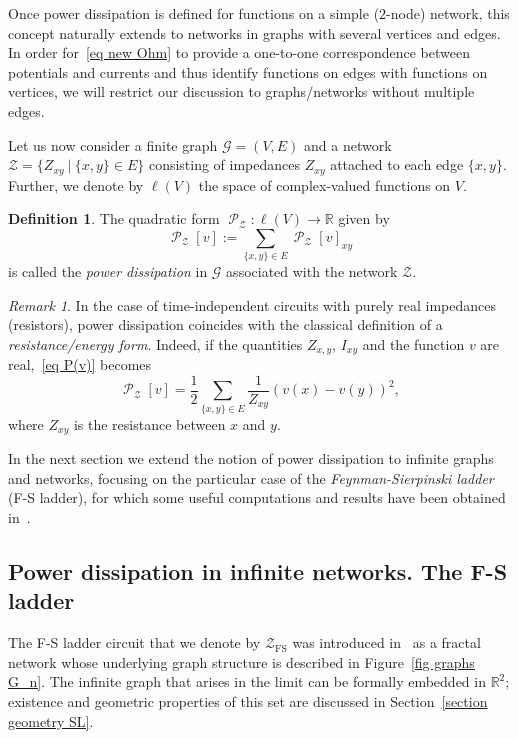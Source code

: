 \documentclass[11pt]{amsart}
\theoremstyle{definition}
\newtheorem{definition}{Definition}[section]
\theoremstyle{remark}
\newtheorem{remark}{Remark}[section]
\theoremstyle{example}
\numberwithin{equation}{section}
\providecommand{\pd}[1]{\operatorname{\mathcal {P}}_{#1}}
\begin{document}
Once power dissipation is defined for functions on a simple ($2$-node) network, this concept naturally extends to networks in graphs with several vertices and edges. In order for~\eqref{eq new Ohm} to provide a one-to-one correspondence between potentials and currents and thus identify functions on edges with functions on vertices, we will restrict our discussion to graphs/networks without multiple edges.
\medskip

Let us now consider a finite graph ${\mathcal{G}}=(V,E)$ and a network ${\mathcal{Z}}=\{Z_{xy}~|~\{x,y\}\in E\}$ consisting of impedances $Z_{xy}$ attached to each edge $\{x,y\}$. Further, we denote by $\ell(V)$ the space of complex-valued functions on $V$. 
\begin{definition}
The quadratic form $\pd{\mathcal{Z}}\colon\ell(V)\to{{\mathbb R}}$ given by
\begin{equation}\label{eq general def P(v)}
\pd{\mathcal{Z}}[v]:=\sum_{\{x,y\}\in E}\pd{\mathcal{Z}}[v]_{xy}
\end{equation}
is called the \textit{power dissipation} in ${\mathcal{G}}$ associated with the network ${\mathcal{Z}}$. 
\end{definition}
\begin{remark}
In the case of time-independent circuits with purely real impedances (resistors), power dissipation coincides with the classical definition of a \textit{resistance/energy form}. Indeed, if the quantities $Z_{x,y}$, $I_{xy}$ and the function $v$ are real,~\eqref{eq P(v)} becomes
\[
\pd{\mathcal{Z}}[v]=\frac{1}{2}\sum_{\{x,y\}\in E}\frac{1}{Z_{xy}}(v(x)-v(y))^2,
\]
where $Z_{xy}$ is the resistance between $x$ and $y$. 
\end{remark}

In the next section we extend the notion of power dissipation to infinite graphs and networks, focusing on the particular case of the \textit{Feynman-Sierpinski ladder} (F-S ladder), for which some useful computations and results have been obtained in~\cite{A++16}.

\subsection{Power dissipation in infinite networks. The F-S ladder}\label{section PD in infinite networks}
The F-S ladder circuit that we denote by ${\mathcal{Z}}_\operatorname{FS}$ was introduced in~\cite{A++16} as a fractal network whose underlying graph structure is described in Figure~\ref{fig graphs G_n}. The infinite graph that arises in the limit can be formally embedded in ${{\mathbb R}}^2$; existence and geometric properties of this set are discussed in Section~\ref{section geometry SL}.
\end{document}
